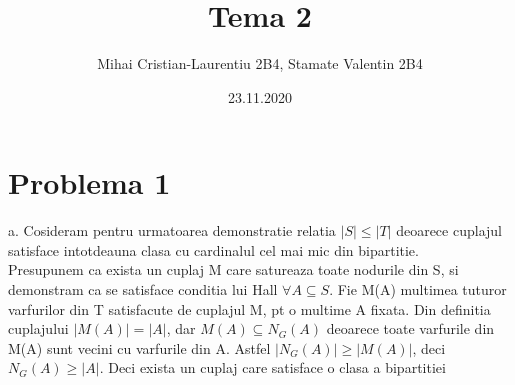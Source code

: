 \documentclass[11pt,leqno]{article}
\title{Tema 2}
\author{Mihai Cristian-Laurentiu 2B4, Stamate Valentin 2B4}
\date{23.11.2020}
\begin{document}
\maketitle

% 

\section*{Problema 1} 
a. Cosideram pentru urmatoarea demonstratie relatia $|S|\leq |T|$ deoarece cuplajul satisface intotdeauna clasa cu cardinalul cel mai mic din bipartitie.\\
Presupunem ca exista un cuplaj M care satureaza toate nodurile din S, si demonstram  ca se satisface conditia lui Hall $\forall A\subseteq S$.
Fie M(A) multimea tuturor varfurilor din T satisfacute de cuplajul M, pt o multime A fixata. Din definitia cuplajului $|M(A)|=|A|$, dar $M(A)\subseteq N_G(A)$ deoarece toate varfurile din M(A) sunt vecini cu varfurile din A. Astfel $|N_G(A)|\geq|M(A)|$, deci $N_G(A)\geq |A|$. Deci exista un cuplaj care satisface o clasa a bipartitiei\\
\end{document}
